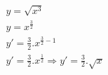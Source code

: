 \begin{ex}
\begin{align}
&y=\sqrt{x^3}\nonumber\\
&y=x^\frac{3}{2}\nonumber\\
&y'=\frac{3}{2}.x^{\frac{3}{2}-1}\nonumber\\
&y'=\frac{3}{2}.x^\frac{1}{2}\Rightarrow y'=\frac{3}{2}.\sqrt{x}\nonumber
\end{align}
\end{ex}